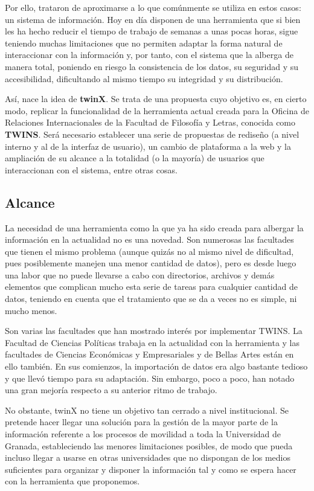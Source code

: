 Por ello, trataron de aproximarse a lo que comúnmente se utiliza en estos casos: un sistema de información. Hoy en día disponen de una herramienta que si bien les ha hecho reducir el tiempo de trabajo de semanas a unas pocas horas, sigue teniendo muchas limitaciones que no permiten adaptar la forma natural de interaccionar con la información y, por tanto, con el sistema que la alberga de manera total, poniendo en riesgo la consistencia de los datos, su seguridad y su accesibilidad, dificultando al mismo tiempo su integridad y su distribución.

Así, nace la idea de \textbf{twinX}. Se trata de una propuesta cuyo objetivo es, en cierto modo, replicar la funcionalidad de la herramienta actual creada para la Oficina de Relaciones Internacionales de la Facultad de Filosofía y Letras, conocida como \textbf{TWINS}. Será necesario establecer una serie de propuestas de rediseño (a nivel interno y al de la interfaz de usuario), un cambio de plataforma a la web y la ampliación de su alcance a la totalidad (o la mayoría) de usuarios que interaccionan con el sistema, entre otras cosas.

\subsection{Alcance}

La necesidad de una herramienta como la que ya ha sido creada para albergar la información en la actualidad no es una novedad. Son numerosas las facultades que tienen el mismo problema (aunque quizás no al mismo nivel de dificultad, pues posiblemente manejen una menor cantidad de datos), pero es desde luego una labor que no puede llevarse a cabo con directorios, archivos y demás elementos que complican mucho esta serie de tareas para cualquier cantidad de datos, teniendo en cuenta que el tratamiento que se da a veces no es simple, ni mucho menos.

Son varias las facultades que han mostrado interés por implementar TWINS. La Facultad de Ciencias Políticas trabaja en la actualidad con la herramienta y las facultades de Ciencias Económicas y Empresariales y de Bellas Artes están en ello también. En sus comienzos, la importación de datos era algo bastante tedioso y que llevó tiempo para su adaptación. Sin embargo, poco a poco, han notado una gran mejoría respecto a su anterior ritmo de trabajo.

No obstante, twinX no tiene un objetivo tan cerrado a nivel institucional. Se pretende hacer llegar una solución para la gestión de la mayor parte de la información referente a los procesos de movilidad a toda la Universidad de Granada, estableciendo las menores limitaciones posibles, de modo que pueda incluso llegar a usarse en otras universidades que no dispongan de los medios suficientes para organizar y disponer la información tal y como se espera hacer con la herramienta que proponemos.

